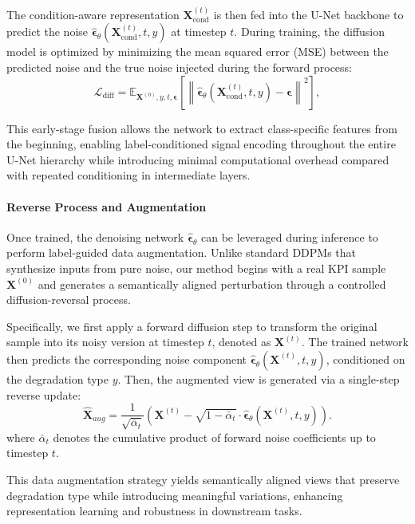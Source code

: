\documentclass[lettersize,journal]{IEEEtran}
\begin{document}
The condition-aware representation $\mathbf{X}_{\text{cond}}^{(t)}$ is then fed into the U-Net\cite{ronneberger2015u} backbone to predict the noise $\hat{\boldsymbol{\epsilon}}_\theta(\mathbf{X}_{\text{cond}}^{(t)}, t, y)$ at timestep $t$.
During training, the diffusion model is optimized by minimizing the mean squared error (MSE) between the predicted noise and the true noise injected during the forward process:
\begin{equation}
\mathcal{L}_{\text{diff}} = \mathbb{E}_{\mathbf{X}^{(0)}, y, t, \boldsymbol{\epsilon}} \left[ \left\| \hat{\boldsymbol{\epsilon}}_\theta(\mathbf{X}_{\text{cond}}^{(t)}, t, y) - \boldsymbol{\epsilon} \right\|^2 \right],
\end{equation}

This early-stage fusion allows the network to extract class-specific features from the beginning, enabling label-conditioned signal encoding throughout the entire U-Net hierarchy while introducing minimal computational overhead compared with repeated conditioning in intermediate layers.

\paragraph{Reverse Process and Augmentation}
Once trained, the denoising network $\hat{\boldsymbol{\epsilon}}_\theta$ can be leveraged during inference to perform label-guided data augmentation. Unlike standard DDPMs that synthesize inputs from pure noise, our method begins with a real KPI sample $\mathbf{X}^{(0)}$ and generates a semantically aligned perturbation through a controlled diffusion-reversal process.

Specifically, we first apply a forward diffusion step to transform the original sample into its noisy version at timestep $t$, denoted as $\mathbf{X}^{(t)}$. The trained network then predicts the corresponding noise component $\hat{\boldsymbol{\epsilon}}_\theta(\mathbf{X}^{(t)}, t, y)$, conditioned on the degradation type $y$. Then, the augmented view is generated via a single-step reverse update:
\begin{equation}
\hat{\mathbf{X}}_{aug} = \frac{1}{\sqrt{\bar{\alpha}_t}} \left( \mathbf{X}^{(t)} - \sqrt{1 - \bar{\alpha}_t} \cdot \hat{\boldsymbol{\epsilon}}_\theta(\mathbf{X}^{(t)}, t, y) \right).
\end{equation}
where $\bar{\alpha}_t$ denotes the cumulative product of forward noise coefficients up to timestep $t$.

This data augmentation strategy yields semantically aligned views that preserve degradation type while introducing meaningful variations, enhancing representation learning and robustness in downstream tasks.
\end{document}
